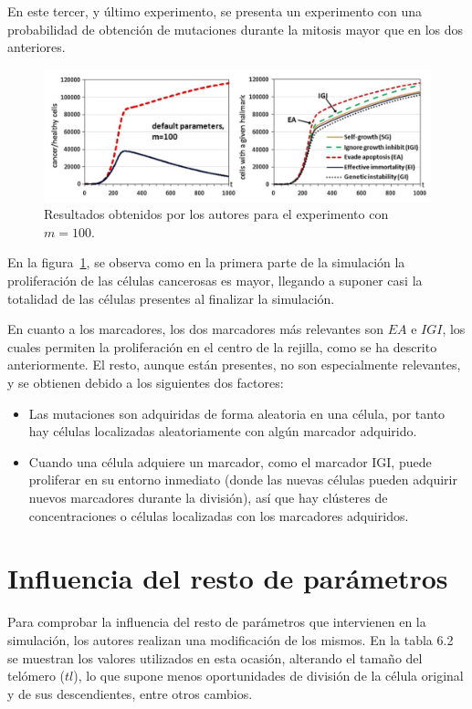 En este tercer, y último experimento, se presenta un experimento con una probabilidad de obtención de
mutaciones durante la mitosis mayor que en los dos anteriores.

\begin{figure}[h]
\centering
\includegraphics[scale=0.6]{figures/experiments/exp3}
\caption{Resultados obtenidos por los autores para el experimento con $m=100$.}
\label{fig:exp3}
\end{figure}

En la figura~\ref{fig:exp3}, se observa como en la primera parte de la simulación la proliferación
de las células cancerosas es mayor, llegando a suponer casi la totalidad de las células presentes
al finalizar la simulación.

En cuanto a los marcadores, los dos marcadores más relevantes son $EA$ e $IGI$, los cuales
permiten la proliferación en el centro de la rejilla, como se ha descrito anteriormente.
El resto, aunque están presentes, no son especialmente relevantes, y se obtienen debido a
los siguientes dos factores:

\begin{itemize}
  \item Las mutaciones son adquiridas de forma aleatoria en una célula, por tanto hay células localizadas aleatoriamente con algún marcador adquirido.
  \item Cuando una célula adquiere un marcador, como el marcador IGI, puede proliferar en su entorno inmediato (donde las nuevas células pueden adquirir nuevos marcadores durante la división), así que hay clústeres de concentraciones o células localizadas con los marcadores adquiridos.
\end{itemize}

\section{Influencia del resto de parámetros}

Para comprobar la influencia del resto de parámetros que intervienen en la simulación,
los autores realizan una modificación de los mismos. En la tabla 6.2 se muestran los valores
utilizados en esta ocasión, alterando el tamaño del telómero ($tl$), lo que supone
menos oportunidades de división de la célula original y de sus descendientes, entre otros
cambios.

